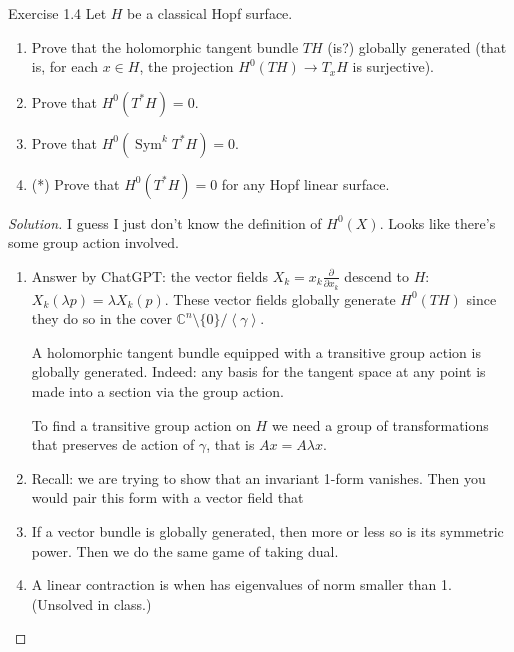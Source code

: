 \begin{thing4}{Exercise 1.4}\label{exer:1.4}\leavevmode
Let \(H\) be a classical Hopf surface.
\begin{enumerate}[label=(\alph*)]
\item Prove that the holomorphic tangent bundle \(TH\) {\color{4}(is?)} globally generated (that is, for each \(x \in H\), the projection \(H^{0}(TH)\longrightarrow T_xH\) is surjective).
 \item Prove that \(H^{0}(T^*H)=0\).
\item Prove that \(H^{0}(\operatorname{Sym}^k T^* H)=0\).
\item (*) Prove that \(H^{0}(T^*H)=0\) for any Hopf linear surface.
\end{enumerate}
\end{thing4}

\begin{proof}[Solution]\leavevmode
I guess I just don't know the definition of  \(H^{0}(X)\). Looks like there's some group action involved.
\begin{enumerate}[label=(\alph*)]
	\item Answer by ChatGPT: the vector fields \(X_k=x_k\frac{\partial }{\partial x_k}\) descend to \(H\): \(X_k(\lambda p)=\lambda X_k(p)\). These vector fields globally generate \(H^0(TH)\) since they do so in the cover  \(\mathbb{C}^n \setminus \{0\} / \left<\gamma\right>\).

		A holomorphic tangent bundle equipped with a transitive group action is globally generated. Indeed: any basis for the tangent space at any point is made into a section via the group action.

	To find a transitive group action on \(H\) we need a group of transformations that preserves de action of \(\gamma\), that is \(Ax=A \lambda x\).


	\item {\color{6}Recall: we are trying to show that an invariant 1-form vanishes.} Then you would pair this form with a vector field that 

\item If a vector bundle is globally generated, then more or less so is its symmetric power. Then we do the same game of taking dual. 
\item A linear contraction is when has eigenvalues of norm smaller than 1. (Unsolved in class.)
\end{enumerate}
\end{proof}


